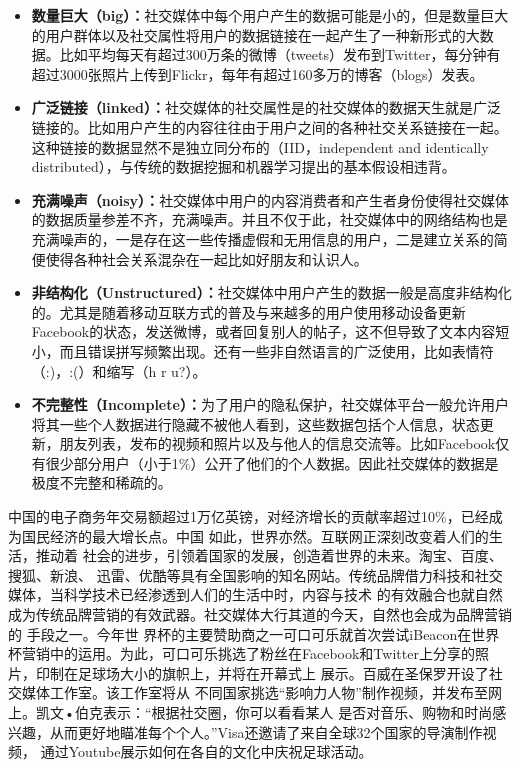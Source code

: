 \begin{itemize}
\item \textbf{数量巨大（big）：}社交媒体中每个用户产生的数据可能是小的，但是数量巨大的用户群体以及社交属性将用户的数据链接在一起产生了一种新形式的大数据。比如平均每天有超过300万条的微博（tweets）发布到Twitter，每分钟有超过3000张照片上传到Flickr，每年有超过160多万的博客（blogs）发表。
\item \textbf{广泛链接（linked）：}社交媒体的社交属性是的社交媒体的数据天生就是广泛链接的。比如用户产生的内容往往由于用户之间的各种社交关系链接在一起。这种链接的数据显然不是独立同分布的（IID，independent and identically distributed），与传统的数据挖掘和机器学习提出的基本假设相违背。
\item \textbf{充满噪声（noisy）：}社交媒体中用户的内容消费者和产生者身份使得社交媒体的数据质量参差不齐，充满噪声。并且不仅于此，社交媒体中的网络结构也是充满噪声的，一是存在这一些传播虚假和无用信息的用户，二是建立关系的简便使得各种社会关系混杂在一起比如好朋友和认识人。
\item \textbf{非结构化（Unstructured）：}社交媒体中用户产生的数据一般是高度非结构化的。尤其是随着移动互联方式的普及与来越多的用户使用移动设备更新Facebook的状态，发送微博，或者回复别人的帖子，这不但导致了文本内容短小，而且错误拼写频繁出现。还有一些非自然语言的广泛使用，比如表情符（:)，:(）和缩写（h r u?）。
\item \textbf{不完整性（Incomplete）：}为了用户的隐私保护，社交媒体平台一般允许用户将其一些个人数据进行隐藏不被他人看到，这些数据包括个人信息，状态更新，朋友列表，发布的视频和照片以及与他人的信息交流等。比如Facebook仅有很少部分用户（小于1\%）公开了他们的个人数据。因此社交媒体的数据是极度不完整和稀疏的。
\end{itemize}
中国的电子商务年交易额超过1万亿英镑，对经济增长的贡献率超过10\%，已经成为国民经济的最大增长点。中国 如此，世界亦然。互联网正深刻改变着人们的生活，推动着 社会的进步，引领着国家的发展，创造着世界的未来。淘宝、百度、搜狐、新浪、 迅雷、优酷等具有全国影响的知名网站。传统品牌借力科技和社交媒体，当科学技术已经渗透到人们的生活中时，内容与技术 的有效融合也就自然成为传统品牌营销的有效武器。社交媒体大行其道的今天，自然也会成为品牌营销的 手段之一。今年世 界杯的主要赞助商之一可口可乐就首次尝试iBeacon在世界杯营销中的运用。为此，可口可乐挑选了粉丝在Facebook和Twitter上分享的照片，印制在足球场大小的旗帜上，并将在开幕式上 展示。百威在圣保罗开设了社交媒体工作室。该工作室将从 不同国家挑选“影响力人物”制作视频，并发布至网上。凯文•伯克表示：“根据社交圈，你可以看看某人 是否对音乐、购物和时尚感兴趣，从而更好地瞄准每个个人。”Visa还邀请了来自全球32个国家的导演制作视频， 通过Youtube展示如何在各自的文化中庆祝足球活动。

